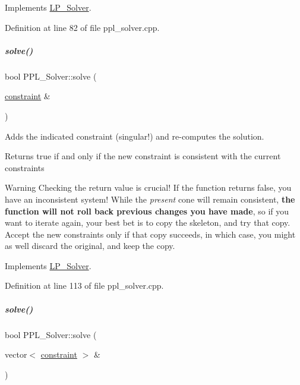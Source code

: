 Implements \hyperlink{group___c_l_s_solvers_a442ad4ad67ee2feff0df49e9201d61ca}{L\+P\+\_\+\+Solver}.



Definition at line 82 of file ppl\+\_\+solver.\+cpp.

\mbox{\label{group___c_l_s_solvers_a1ff16def22c734348c626b65437dd1e3}} 
\subparagraph{\texorpdfstring{solve()}{solve()}\hspace{0.1cm}{\footnotesize\ttfamily [1/2]}}
{\footnotesize\ttfamily bool P\+P\+L\+\_\+\+Solver\+::solve (\begin{DoxyParamCaption}\item[{\hyperlink{group___c_l_s_solvers_classconstraint}{constraint} \&}]{ }\end{DoxyParamCaption})\hspace{0.3cm}{\ttfamily [virtual]}}



Adds the indicated constraint (singular!) and re-\/computes the solution. 

\begin{DoxyReturn}{Returns}
{\ttfamily true} if and only if the new constraint is consistent with the current constraints
\end{DoxyReturn}
\begin{DoxyWarning}{Warning}
Checking the return value is crucial! If the function returns {\ttfamily false}, you have an inconsistent system! While the {\itshape present} cone will remain consistent, {\bfseries the function will not roll back previous changes you have made}, so if you want to iterate again, your best bet is to copy the skeleton, and try that copy. Accept the new constraints only if that copy succeeds, in which case, you might as well discard the original, and keep the copy. 
\end{DoxyWarning}


Implements \hyperlink{group___c_l_s_solvers_abd84374c52124116becc8924dc74e12d}{L\+P\+\_\+\+Solver}.



Definition at line 113 of file ppl\+\_\+solver.\+cpp.

\mbox{\label{group___c_l_s_solvers_a5000b8c5bee37029276ce63a3568bfb7}} 
\subparagraph{\texorpdfstring{solve()}{solve()}\hspace{0.1cm}{\footnotesize\ttfamily [2/2]}}
{\footnotesize\ttfamily bool P\+P\+L\+\_\+\+Solver\+::solve (\begin{DoxyParamCaption}\item[{vector$<$ \hyperlink{group___c_l_s_solvers_classconstraint}{constraint} $>$ \&}]{ }\end{DoxyParamCaption})\hspace{0.3cm}{\ttfamily [virtual]}}



